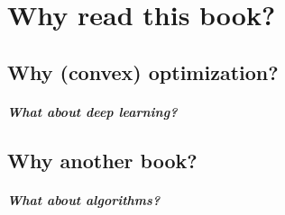\chapter{Why read this book?}
\label{chap:why_this_book}

\section{Why (convex) optimization?}



\paragraph{What about deep learning?}

\section{Why another book?}

\paragraph{What about algorithms?}

